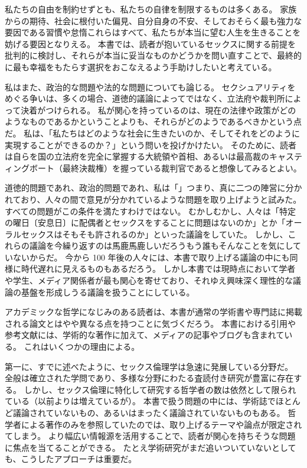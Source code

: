 \documentclass[paper=a4,book,openany]{jlreq} \usepackage{mystyle}
\begin{document}
私たちの自由を制約せずとも、私たちの自律を制限するものは多くある。
家族からの期待、社会に根付いた偏見、自分自身の不安、そしておそらく最も強力な要因である習慣や怠惰{\DDASH}これらはすべて、私たちが本当に望む人生を生きることを妨げる要因となりえる。
本書では、読者が抱いているセックスに関する前提を批判的に検討し、それらが本当に妥当なものかどうかを問い直すことで、最終的に最も幸福をもたらす選択をおこなえるよう手助けしたいと考えている。

私はまた、政治的な問題や法的な問題についても論じる。
セクシュアリティをめぐる争いは、多くの場合、道徳的議論によってではなく、立法府や裁判所によって決着がつけられる。
私が関心を持っているのは、現在の法律や政策がどのようなものであるかということよりも、それらがどのようであるべきかという点だ。
私は、「私たちはどのような社会に生きたいのか、そしてそれをどのように実現することができるのか？」という問いを投げかけたい。
そのために、読者は自らを国の立法府を完全に掌握する大統領や首相、あるいは最高裁のキャスティングボート（最終決裁権）を握っている裁判官であると想像してみるとよい。

道徳的問題であれ、政治的問題であれ、私は「」{\DDASH}つまり、真に二つの陣営に分かれており、人々の間で意見が分かれているような問題{\DDASH}を取り上げようと試みた。
すべての問題がこの条件を満たすわけではない。
むかしむかし、人々は「特定の曜日〔安息日〕に配偶者とセックスをすることに問題はないのか」とか「オーラルセックスはそもそも許されるのか」といった議論をしていた。
しかし、これらの議論を今繰り返すのは馬鹿馬鹿しいだろう{\DDASH}もう誰もそんなことを気にしていないからだ。
今から 100 年後の人々には、本書で取り上げる議論の中にも同様に時代遅れに見えるものもあるだろう。
しかし本書では現時点において学者や学生、メディア関係者が最も関心を寄せており、それゆえ興味深く理性的な議論の基盤を形成しうる議論を扱うことにしている。

アカデミックな哲学になじみのある読者は、本書が通常の学術書や専門誌に掲載される論文とはやや異なる点を持つことに気づくだろう。
本書における引用や参考文献には、学術的な著作に加えて、メディアの記事やブログも含まれている。
これはいくつかの理由による。

第一に、すでに述べたように、セックス倫理学は急速に発展している分野だ。
全般は確立された学問であり、多様な分野にわたる査読付き研究が豊富に存在する。
しかし、セックス倫理に特化して研究する哲学者の数は依然として限られている（以前よりは増えているが）。
本書で扱う問題の中には、学術誌でほとんど議論されていないもの、あるいはまったく議論されていないものもある。
哲学者による著作のみを参照していたのでは、取り上げるテーマや論点が限定されてしまう。
より幅広い情報源を活用することで、読者が関心を持ちそうな問題に焦点を当てることができる。
たとえ学術研究がまだ追いついていないとしても、こうしたアプローチは重要だ。
\end{document}
